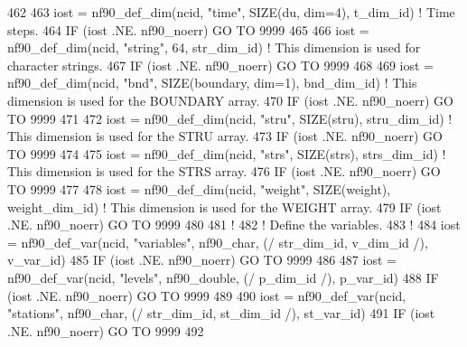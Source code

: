\begin{DoxyCode}
462 
463     iost    = nf90\_def\_dim(ncid, \textcolor{stringliteral}{"time"}, \textcolor{keyword}{SIZE}(du, dim=4), t\_dim\_id)         \textcolor{comment}{! Time steps.}
464     \textcolor{keywordflow}{IF} (iost .NE. nf90\_noerr) \textcolor{keywordflow}{GO TO} 9999
465 
466     iost    = nf90\_def\_dim(ncid, \textcolor{stringliteral}{"string"}, 64, str\_dim\_id)                  \textcolor{comment}{! This dimension is used for
       character strings.}
467     \textcolor{keywordflow}{IF} (iost .NE. nf90\_noerr) \textcolor{keywordflow}{GO TO} 9999
468 
469     iost    = nf90\_def\_dim(ncid, \textcolor{stringliteral}{"bnd"}, \textcolor{keyword}{SIZE}(boundary, dim=1), bnd\_dim\_id)  \textcolor{comment}{! This dimension is used for
       the BOUNDARY array.}
470     \textcolor{keywordflow}{IF} (iost .NE. nf90\_noerr) \textcolor{keywordflow}{GO TO} 9999
471 
472     iost    = nf90\_def\_dim(ncid, \textcolor{stringliteral}{"stru"}, \textcolor{keyword}{SIZE}(stru), stru\_dim\_id)           \textcolor{comment}{! This dimension is used for
       the STRU array.}
473     \textcolor{keywordflow}{IF} (iost .NE. nf90\_noerr) \textcolor{keywordflow}{GO TO} 9999
474 
475     iost    = nf90\_def\_dim(ncid, \textcolor{stringliteral}{"strs"}, \textcolor{keyword}{SIZE}(strs), strs\_dim\_id)           \textcolor{comment}{! This dimension is used for
       the STRS array.}
476     \textcolor{keywordflow}{IF} (iost .NE. nf90\_noerr) \textcolor{keywordflow}{GO TO} 9999
477 
478     iost    = nf90\_def\_dim(ncid, \textcolor{stringliteral}{"weight"}, \textcolor{keyword}{SIZE}(weight), weight\_dim\_id)     \textcolor{comment}{! This dimension is used for
       the WEIGHT array.}
479     \textcolor{keywordflow}{IF} (iost .NE. nf90\_noerr) \textcolor{keywordflow}{GO TO} 9999
480 
481     \textcolor{comment}{!}
482     \textcolor{comment}{! Define the variables.}
483     \textcolor{comment}{!}
484     iost    = nf90\_def\_var(ncid, \textcolor{stringliteral}{"variables"}, nf90\_char, (/ str\_dim\_id, v\_dim\_id /), v\_var\_id)
485     \textcolor{keywordflow}{IF} (iost .NE. nf90\_noerr) \textcolor{keywordflow}{GO TO} 9999
486 
487     iost    = nf90\_def\_var(ncid, \textcolor{stringliteral}{"levels"}, nf90\_double, (/ p\_dim\_id /), p\_var\_id)
488     \textcolor{keywordflow}{IF} (iost .NE. nf90\_noerr) \textcolor{keywordflow}{GO TO} 9999
489 
490     iost    = nf90\_def\_var(ncid, \textcolor{stringliteral}{"stations"}, nf90\_char, (/ str\_dim\_id, st\_dim\_id /), st\_var\_id)
491     \textcolor{keywordflow}{IF} (iost .NE. nf90\_noerr) \textcolor{keywordflow}{GO TO} 9999
492 

\end{DoxyCode}
